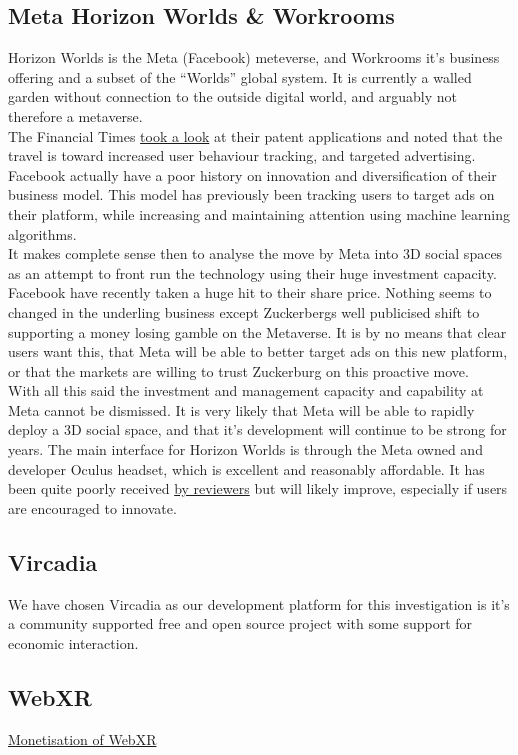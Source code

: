 \subsection{Meta Horizon Worlds \& Workrooms}
Horizon Worlds is the Meta (Facebook) meteverse, and Workrooms it's business offering and a subset of the ``Worlds'' global system. It is currently a walled garden without connection to the outside digital world, and arguably not therefore a metaverse.\\
The Financial Times \href{}{took a look} at their patent applications and noted that the travel is toward increased user behaviour tracking, and targeted advertising.\\
Facebook actually have a poor history on innovation and diversification of their business model. This model has previously been tracking users to target ads on their platform, while increasing and maintaining attention using machine learning algorithms. \\
It makes complete sense then to analyse the move by Meta into 3D social spaces as an attempt to front run the technology using their huge investment capacity. Facebook have recently taken a huge hit to their share price. Nothing seems to changed in the underling business except Zuckerbergs well publicised shift to supporting a money losing gamble on the Metaverse. It is by no means that clear users want this, that Meta will be able to better target ads on this new platform, or that the markets are willing to trust Zuckerburg on this proactive move. \\
With all this said the investment and management capacity and capability at Meta cannot be dismissed. It is very likely that Meta will be able to rapidly deploy a 3D social space, and that it's development will continue to be strong for years. The main interface for Horizon Worlds is through the Meta owned and developer Oculus headset, which is excellent and reasonably affordable. It has been quite poorly received \href{https://kotaku.com/facebook-metaverse-horizon-worlds-vr-oculus-quest-2-cha-1848436740}{by reviewers} but will likely improve, especially if users are encouraged to innovate.
\subsection{Vircadia}
We have chosen Vircadia as our development platform for this investigation is it's a community supported free and open source project with some support for economic interaction.
\subsection{WebXR}
\href{https://hackmd.io/@XR/monetization}{Monetisation of WebXR}
